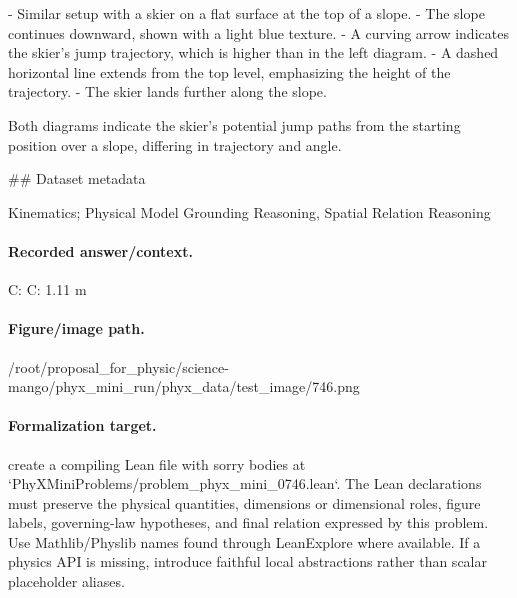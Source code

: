- Similar setup with a skier on a flat surface at the top of a slope.
- The slope continues downward, shown with a light blue texture.
- A curving arrow indicates the skier’s jump trajectory, which is higher than in the left diagram.
- A dashed horizontal line extends from the top level, emphasizing the height of the trajectory.
- The skier lands further along the slope.

Both diagrams indicate the skier’s potential jump paths from the starting position over a slope, differing in trajectory and angle.

\#\# Dataset metadata

Kinematics; Physical Model Grounding Reasoning, Spatial Relation Reasoning

\paragraph{Recorded answer/context.}
C: C: 1.11 m

\paragraph{Figure/image path.}
/root/proposal\_for\_physic/science-mango/phyx\_mini\_run/phyx\_data/test\_image/746.png

\paragraph{Formalization target.}
create a compiling Lean file with sorry bodies at `PhyXMiniProblems/problem\_phyx\_mini\_0746.lean`. The Lean declarations must preserve the physical quantities, dimensions or dimensional roles, figure labels, governing-law hypotheses, and final relation expressed by this problem.
Use Mathlib/Physlib names found through LeanExplore where available. If a physics API is missing, introduce faithful local abstractions rather than scalar placeholder aliases.

